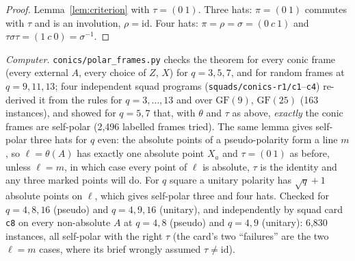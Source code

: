 \documentclass[11pt]{amsart}
\theoremstyle{definition}
\theoremstyle{remark}
\begin{document}
\begin{proof}
Lemma~\ref{lem:criterion} with $\tau=(0\ 1)$. Three hats: $\pi=(0\ 1)$ commutes with $\tau$ and is an involution,
$\rho=\mathrm{id}$. Four hats: $\pi=\rho=\sigma=(0\ c\ 1)$ and $\tau\sigma\tau=(1\ c\ 0)=\sigma^{-1}$.
\end{proof}

\emph{Computer.} \texttt{conics/polar\_frames.py} checks the theorem for every conic frame (every external $A$, every
choice of $Z$, $X$) for $q=3,5,7$, and for random frames at $q=9,11,13$; four independent squad programs
(\texttt{squads/conics-r1/c1}--\texttt{c4}) re-derived it from the rules for $q=3,\dots,13$ and over
$\mathrm{GF}(9)$, $\mathrm{GF}(25)$ (163 instances), and showed for $q=5,7$ that, with $\theta$ and $\tau$ as above,
\emph{exactly} the conic frames are self-polar (2,496 labelled frames tried). The same lemma gives self-polar three
hats for $q$ even: the absolute points of a pseudo-polarity form a line $m$, so $\ell=\theta(A)$ has exactly one
absolute point $X_a$ and $\tau=(0\ 1)$ as before, unless $\ell=m$, in which case every point of $\ell$ is absolute,
$\tau$ is the identity and any three marked points will do. For $q$ square a unitary polarity has $\sqrt q+1$
absolute points on $\ell$, which gives self-polar three and four hats. Checked for $q=4,8,16$ (pseudo) and $q=4,9,16$
(unitary), and independently by squad card \texttt{c8} on every non-absolute $A$ at $q=4,8$ (pseudo) and $q=4,9$
(unitary): 6,830 instances, all self-polar with the right $\tau$ (the card's two ``failures'' are the two
$\ell=m$ cases, where its brief wrongly assumed $\tau\ne\mathrm{id}$).
\end{document}
